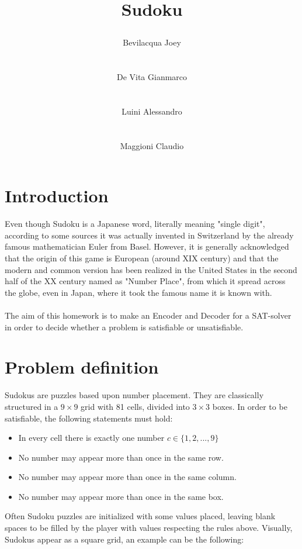 \documentclass[]{usiinfprospectus}
\author{\centerline{Bevilacqua Joey} \\[3pt] \centerline{De Vita Gianmarco}  \\[3pt] \centerline{Luini Alessandro}  \\[3pt] \centerline{Maggioni Claudio}}
\title{\centerline{Sudoku}}
\newcounter{row}
\newcounter{col}
\begin{document}
\maketitle
\tableofcontents
\newpage
\section{Introduction} \label{introduction}
Even though Sudoku is a Japanese word, literally meaning "single digit", according to some sources it was actually invented in Switzerland by the already famous mathematician Euler from Basel. However, it is generally acknowledged that the origin of this game is European (around XIX century) and that the modern and common version has been realized in the United States in the second half of the XX century named as "Number Place", from which it spread across the globe, even in Japan, where it took the famous name it is known with.\\ \\
The aim of this homework is to make an Encoder and Decoder for a SAT-solver in order to decide whether a problem is satisfiable or unsatisfiable. 
\newpage
\section{Problem definition} \label{problem}
Sudokus are puzzles based upon number placement. They are classically structured in a $9\times 9$ grid with 81 cells, divided into $3\times 3$ boxes. In order to be satisfiable, the following statements must hold:
\begin{itemize}%
\item In every cell there is exactly one number $c \in \{1, 2, ..., 9 \}$
\item No number may appear more than once in the same row.
\item No number may appear more than once in the same column.
\item No number may appear more than once in the same box.
\end{itemize}
Often Sudoku puzzles are initialized with some values placed, leaving blank spaces to be filled by the player with values respecting the rules above. Visually, Sudokus appear as a square grid, an example can be the following:
\end{document}
